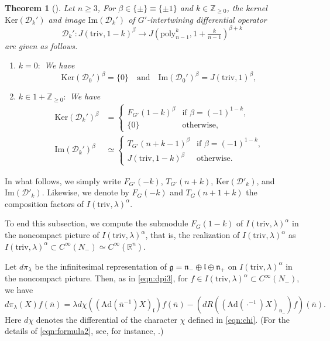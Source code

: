 \documentclass[reqno,11pt]{amsart}
\newtheorem{thm}[equation]{Theorem}
\theoremstyle{remark}
\theoremstyle{definition}
\numberwithin{equation}{section}
\newcommand{\gb}{\beta}
\newcommand{\ga}{\alpha}
\newcommand{\fg}{{\mathfrak g}}
\newcommand{\fl}{{\mathfrak l}}
\newcommand{\fn}{{\mathfrak n}}
\newcommand{\R}{\mathbb{R}}
\newcommand{\Z}{\mathbb{Z}}
\newcommand{\Ad}{\mathrm{Ad}}
\newcommand{\Cal}{\mathcal}
\renewcommand{\Im}{\mathrm{Im}}
\newcommand{\poly}{\mathrm{poly}}
\newcommand{\To}{\longrightarrow}
\newcommand{\triv}{\mathrm{triv}}
\newcommand{\dpi}{d\pi}
\newcommand{\Ker}{\mathrm{Ker}}
\newcommand{\D}{\Cal{D}}
\begin{document}
\begin{thm}[{\cite[Thm.\ 6.5]{KuOr24}}]
\label{thm:IDO3}
Let $n \geq 3$, For $\gb \in \{\pm\} \equiv \{\pm 1\}$ and
$k \in \Z_{\geq 0}$,
the kernel $\Ker(\D_k')$ and image $\Im(\D_k')$ of
$G'$-intertwining differential operator
\begin{equation*}
\D_k' \colon 
J(\triv, 1-k)^\gb \To J(\poly^k_{n-1}, 1+\tfrac{k}{n-1})^{\gb+k}
\end{equation*}
are given as follows.
\begin{enumerate}
\item[\emph{(1)}]
$k=0:$ We have
\begin{equation*}
\Ker(\D_0')^\beta = \{0\}
\quad
\text{and}
\quad
\Im(\D_0')^\beta = J(\triv, 1)^\gb,
\end{equation*}
\item[\emph{(2)}]
$k \in 1+\Z_{\geq 0}:$
We have 
\begin{align*}
\Ker(\D_k')^\beta &= 
\begin{cases}
F_{G'}(1-k)^\beta & \text{if $\gb = (-1)^{1-k}$,}\\[3pt]
\{0\} & \text{otherwise},
\end{cases}\\[3pt]
\Im(\D_k')^\beta &\simeq
\begin{cases}
T_{G'}(n+k-1)^\beta & \text{if $\gb = (-1)^{1-k}$,}\\[3pt]
J(\triv,1-k)^\gb & \text{otherwise}.
\end{cases}
\end{align*}
\end{enumerate}

\end{thm}

In what follows, we simply write
$F_{G'}(-k)$, $T_{G'}(n+k)$, $\Ker(\D'_k)$, and $\Im(\D'_k)$.
Likewise,
we denote by $F_{G}(-k)$ and $T_{G}(n+1+k)$  the composition factors
of $I(\triv,\lambda)^\ga$.

To end this subsection, we compute 
the submodule $F_G(1-k)$ of $I(\triv, \lambda)^\ga$ in the noncompact picture
of $I(\triv, \lambda)^\ga$,
that is, the realization of $I(\triv, \lambda)^\ga$ as 
$I(\triv, \lambda)^\ga \subset C^\infty(N_-) \simeq C^\infty(\R^n)$. 

Let $\dpi_{\lambda}$ be the infinitesimal representation of 
$\fg= \fn_-\oplus\fl \oplus \fn_+$ on 
$I(\triv, \lambda)^\ga$ in the noncompact picture. 
Then, as in \eqref{eqn:dpi3},
for $f \in I(\triv, \lambda)^\ga \subset C^\infty(N_-)$,
we have
\begin{equation}\label{eqn:formula2}
d\pi_{\lambda}(X)f(\bar{n})
=\lambda d\chi((\Ad(\bar{n}^{-1})X)_\fl)f(\bar{n})
-\left(dR((\Ad(\cdot^{-1})X)_{\fn_-})f\right)(\bar{n}).
\end{equation}
Here $d\chi$ denotes the differential of the character $\chi$ defined in 
\eqref{eqn:chi}.
(For the details of \eqref{eqn:formula2}, see, for instance, 
\cite[Sect.\ 2.2]{KuOr24}.)
\end{document}
